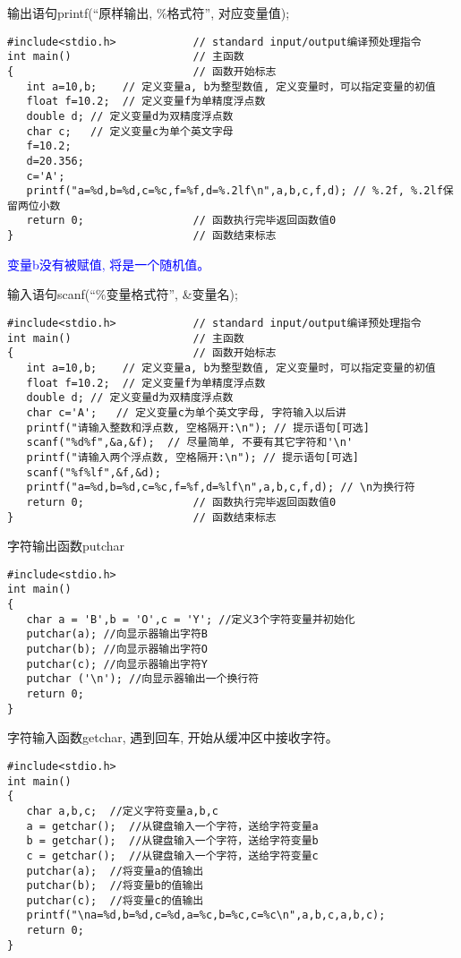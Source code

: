 \begin{frame}{输出语句printf(``原样输出, \%格式符'', 对应变量值);}
\begin{lstlisting}
#include<stdio.h>            // standard input/output编译预处理指令
int main()                   // 主函数
{                            // 函数开始标志
   int a=10,b;    // 定义变量a, b为整型数值, 定义变量时，可以指定变量的初值
   float f=10.2;  // 定义变量f为单精度浮点数
   double d; // 定义变量d为双精度浮点数
   char c;   // 定义变量c为单个英文字母
   f=10.2;
   d=20.356;
   c='A';
   printf("a=%d,b=%d,c=%c,f=%f,d=%.2lf\n",a,b,c,f,d); // %.2f, %.2lf保留两位小数
   return 0;                 // 函数执行完毕返回函数值0
}                            // 函数结束标志
\end{lstlisting}
\textcolor{blue}{变量b没有被赋值, 将是一个随机值。}
\end{frame}

\begin{frame}[fragile]{输入语句scanf(``\%变量格式符'', \&变量名);}
\begin{lstlisting}
#include<stdio.h>            // standard input/output编译预处理指令
int main()                   // 主函数
{                            // 函数开始标志
   int a=10,b;    // 定义变量a, b为整型数值, 定义变量时，可以指定变量的初值
   float f=10.2;  // 定义变量f为单精度浮点数
   double d; // 定义变量d为双精度浮点数
   char c='A';   // 定义变量c为单个英文字母, 字符输入以后讲
   printf("请输入整数和浮点数, 空格隔开:\n"); // 提示语句[可选]
   scanf("%d%f",&a,&f);  // 尽量简单, 不要有其它字符和'\n'
   printf("请输入两个浮点数, 空格隔开:\n"); // 提示语句[可选]
   scanf("%f%lf",&f,&d);
   printf("a=%d,b=%d,c=%c,f=%f,d=%lf\n",a,b,c,f,d); // \n为换行符
   return 0;                 // 函数执行完毕返回函数值0
}                            // 函数结束标志
\end{lstlisting}
\end{frame}

\begin{frame}[fragile]{字符输出函数putchar}
\begin{lstlisting}
#include<stdio.h>
int main()
{
   char a = 'B',b = 'O',c = 'Y'; //定义3个字符变量并初始化
   putchar(a); //向显示器输出字符B
   putchar(b); //向显示器输出字符O
   putchar(c); //向显示器输出字符Y
   putchar ('\n'); //向显示器输出一个换行符
   return 0;
}
\end{lstlisting}
\end{frame}

\begin{frame}[fragile]{字符输入函数getchar, 遇到回车, 开始从缓冲区中接收字符。}
\begin{lstlisting}
#include<stdio.h>
int main()
{
   char a,b,c;  //定义字符变量a,b,c
   a = getchar();  //从键盘输入一个字符，送给字符变量a
   b = getchar();  //从键盘输入一个字符，送给字符变量b
   c = getchar();  //从键盘输入一个字符，送给字符变量c
   putchar(a);  //将变量a的值输出
   putchar(b);  //将变量b的值输出 
   putchar(c);  //将变量c的值输出
   printf("\na=%d,b=%d,c=%d,a=%c,b=%c,c=%c\n",a,b,c,a,b,c);
   return 0;
}
\end{lstlisting}
\end{frame}

